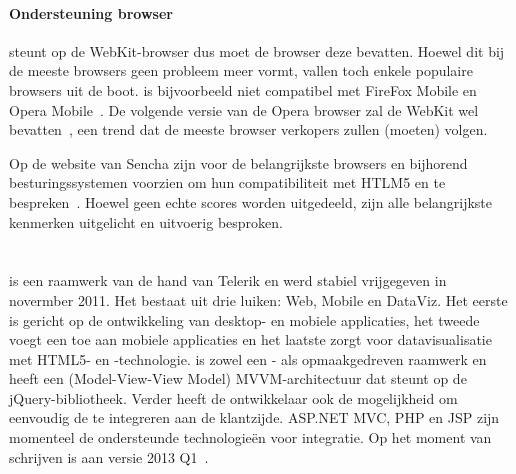 \paragraph{Ondersteuning browser}
\st{} steunt op de WebKit-browser  dus moet de browser deze bevatten.  
Hoewel dit bij de meeste browsers geen probleem meer vormt, vallen toch enkele populaire browsers uit de boot.  
\st{} is bijvoorbeeld niet compatibel met FireFox Mobile en Opera Mobile~\cite{JohnEClark2012}.
De volgende versie van de Opera browser zal de WebKit  wel bevatten~\cite{Wokke2013}, een trend dat de meeste browser verkopers zullen (moeten) volgen.


Op de website van Sencha zijn voor de belangrijkste browsers en bijhorend besturingssystemen  voorzien om hun compatibiliteit met HTLM5 en \st{} te bespreken~\cite{Inc.}.
Hoewel geen echte scores worden uitgedeeld, zijn alle belangrijkste kenmerken uitgelicht en uitvoerig besproken. 


\section{\kendo}
\label{sec:raamwerk-kendo}
\kendo{} is een raamwerk van de hand van Telerik en werd stabiel vrijgegeven in novermber 2011.
Het bestaat uit drie luiken:  Web, Mobile en DataViz.  
Het eerste is gericht op de ontwikkeling van desktop- en mobiele applicaties,  het tweede voegt een  toe aan mobiele applicaties en het laatste zorgt voor datavisualisatie met HTML5- en \js{}-technologie.
\kendo{} is zowel een \js{}- als opmaakgedreven raamwerk en heeft een (Model-View-View Model) MVVM-architectuur dat steunt op de jQuery-bibliotheek.
Verder heeft de ontwikkelaar ook de mogelijkheid om eenvoudig de  te integreren aan de klantzijde.
ASP.NET MVC,  PHP en JSP zijn momenteel de ondersteunde technologieën voor integratie.
Op het moment van schrijven is \kendo{} aan versie 2013 Q1~\cite{Telerike}. 

